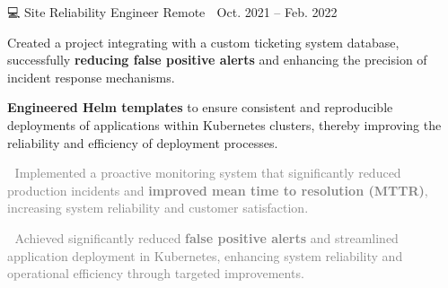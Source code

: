 \documentclass{awesome-cv}
\newcommand{\hll}[1]{\noindent\colorbox{light-gray}{\parbox{17.5cm}{\textcolor{gray}{#1}}}}
\begin{document}
{\begin{cventries}

        {💻 Site Reliability Engineer} %
        {Remote 📍} %
        {Oct. 2021 – Feb. 2022 📆} %
        {\begin{cvitems}
                \item {Created a project integrating with a custom ticketing system database, successfully \textbf{reducing false positive alerts} and enhancing the precision of incident response mechanisms.}
                \item {\textbf{Engineered Helm templates} to ensure consistent and reproducible deployments of applications within Kubernetes clusters, thereby improving the reliability and efficiency of deployment processes.}
                \\
                \newline
                \hll{🎯 Implemented a proactive monitoring system that significantly reduced production incidents and \textbf{improved mean time to resolution (MTTR)}, increasing system reliability and customer satisfaction.}
                \hll{🎯 Achieved significantly reduced \textbf{false positive alerts} and streamlined application deployment in Kubernetes, enhancing system reliability and operational efficiency through targeted improvements.}
            \end{cvitems}
        }



\end{cventries}}
\end{document}
